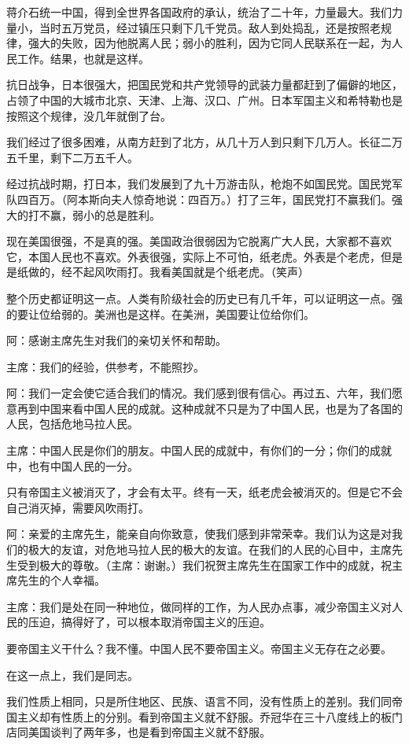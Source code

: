 蒋介石统一中国，得到全世界各国政府的承认，统治了二十年，力量最大。我们力量小，当时五万党员，经过镇压只剩下几千党员。敌人到处捣乱，还是按照老规律，强大的失败，因为他脱离人民；弱小的胜利，因为它同人民联系在一起，为人民工作。结果，也就是这样。

抗日战争，日本很强大，把国民党和共产党领导的武装力量都赶到了偏僻的地区，占领了中国的大城市北京、天津、上海、汉口、广州。日本军国主义和希特勒也是按照这个规律，没几年就倒了台。

我们经过了很多困难，从南方赶到了北方，从几十万人到只剩下几万人。长征二万五千里，剩下二万五千人。

经过抗战时期，打日本，我们发展到了九十万游击队，枪炮不如国民党。国民党军队四百万。（阿本斯向夫人惊奇地说：四百万。）打了三年，国民党打不赢我们。强大的打不赢，弱小的总是胜利。

现在美国很强，不是真的强。美国政治很弱因为它脱离广大人民，大家都不喜欢它，本国人民也不喜欢。外表很强，实际上不可怕，纸老虎。外表是个老虎，但是是纸做的，经不起风吹雨打。我看美国就是个纸老虎。（笑声）

整个历史都证明这一点。人类有阶级社会的历史已有几千年，可以证明这一点。强的要让位给弱的。美洲也是这样。在美洲，美国要让位给你们。

阿：感谢主席先生对我们的亲切关怀和帮助。

主席：我们的经验，供参考，不能照抄。

阿：我们一定会使它适合我们的情况。我们感到很有信心。再过五、六年，我们愿意再到中国来看中国人民的成就。这种成就不只是为了中国人民，也是为了各国的人民，包括危地马拉人民。

主席：中国人民是你们的朋友。中国人民的成就中，有你们的一分；你们的成就中，也有中国人民的一分。

只有帝国主义被消灭了，才会有太平。终有一天，纸老虎会被消灭的。但是它不会自己消灭掉，需要风吹雨打。

阿：亲爱的主席先生，能亲自向你致意，使我们感到非常荣幸。我们认为这是对我们的极大的友谊，对危地马拉人民的极大的友谊。在我们的人民的心目中，主席先生受到极大的尊敬。（主席：谢谢。）我们祝贺主席先生在国家工作中的成就，祝主席先生的个人幸福。

主席：我们是处在同一种地位，做同样的工作，为人民办点事，减少帝国主义对人民的压迫，搞得好了，可以根本取消帝国主义的压迫。

要帝国主义干什么？我不懂。中国人民不要帝国主义。帝国主义无存在之必要。

在这一点上，我们是同志。

我们性质上相同，只是所住地区、民族、语言不同，没有性质上的差别。我们同帝国主义却有性质上的分别。看到帝国主义就不舒服。乔冠华在三十八度线上的板门店同美国谈判了两年多，也是看到帝国主义就不舒服。

